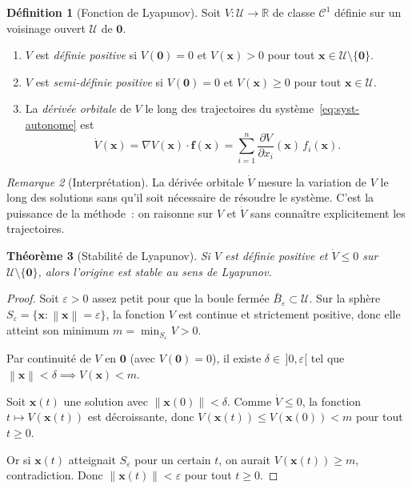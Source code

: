 \documentclass[12pt,a4paper,openany]{book}
\theoremstyle{definition}
\newtheorem{definition}{Définition}[chapter]
\theoremstyle{plain}
\newtheorem{theoreme}[definition]{Théorème}
\theoremstyle{remark}
\newtheorem{remarque}[definition]{Remarque}
\newcommand{\R}{\mathbb{R}}
\newcommand{\norm}[1]{\left\|#1\right\|}
\begin{document}
\begin{definition}[Fonction de Lyapunov]\label{def:fct-lyapunov}
  Soit $V:\mathcal{U}\to\R$ de classe $\mathcal{C}^1$ définie sur un
  voisinage ouvert $\mathcal{U}$ de $\mathbf{0}$.
  \begin{enumerate}[label=(\roman*)]
    \item $V$ est \emph{définie positive} si $V(\mathbf{0})=0$ et
      $V(\mathbf{x})>0$ pour tout $\mathbf{x}\in\mathcal{U}\setminus\{\mathbf{0}\}$.
    \item $V$ est \emph{semi-définie positive} si $V(\mathbf{0})=0$ et
      $V(\mathbf{x})\geq 0$ pour tout $\mathbf{x}\in\mathcal{U}$.
    \item La \emph{dérivée orbitale} de $V$
      le long des trajectoires du système~\eqref{eq:syst-autonome} est
      \[
        \dot{V}(\mathbf{x})
        = \nabla V(\mathbf{x})\cdot\mathbf{f}(\mathbf{x})
        = \sum_{i=1}^n \frac{\partial V}{\partial x_i}(\mathbf{x})\,f_i(\mathbf{x}).
      \]
  \end{enumerate}
\end{definition}

\begin{remarque}[Interprétation]\label{rem:interpret-lyapunov}
  La dérivée orbitale $\dot{V}$ mesure la variation de $V$ le long
  des solutions sans qu'il soit nécessaire de résoudre le système.
  C'est la puissance de la méthode~: on raisonne sur $V$ et $\dot{V}$
  sans connaître explicitement les trajectoires.
\end{remarque}

\begin{theoreme}[Stabilité de Lyapunov]\label{thm:lyapunov-stab}
  Si $V$ est définie positive et $\dot{V}\leq 0$ sur
  $\mathcal{U}\setminus\{\mathbf{0}\}$, alors l'origine est
  \emph{stable} au sens de Lyapunov.
\end{theoreme}

\begin{proof}
  Soit $\varepsilon>0$ assez petit pour que la boule fermée
  $\bar{B}_\varepsilon\subset\mathcal{U}$. Sur la sphère
  $S_\varepsilon=\{\mathbf{x}:\norm{\mathbf{x}}=\varepsilon\}$,
  la fonction $V$ est continue et strictement positive, donc
  elle atteint son minimum $m=\min_{S_\varepsilon}V>0$.

  Par continuité de $V$ en $\mathbf{0}$ (avec $V(\mathbf{0})=0$),
  il existe $\delta\in\,]0,\varepsilon[$ tel que
  $\norm{\mathbf{x}}<\delta\implies V(\mathbf{x})<m$.

  Soit $\mathbf{x}(t)$ une solution avec $\norm{\mathbf{x}(0)}<\delta$.
  Comme $\dot{V}\leq 0$, la fonction $t\mapsto V(\mathbf{x}(t))$ est
  décroissante, donc
  $V(\mathbf{x}(t))\leq V(\mathbf{x}(0))<m$ pour tout $t\geq 0$.

  Or si $\mathbf{x}(t)$ atteignait $S_\varepsilon$ pour un certain
  $t$, on aurait $V(\mathbf{x}(t))\geq m$, contradiction. Donc
  $\norm{\mathbf{x}(t)}<\varepsilon$ pour tout $t\geq 0$.
\end{proof}
\end{document}
